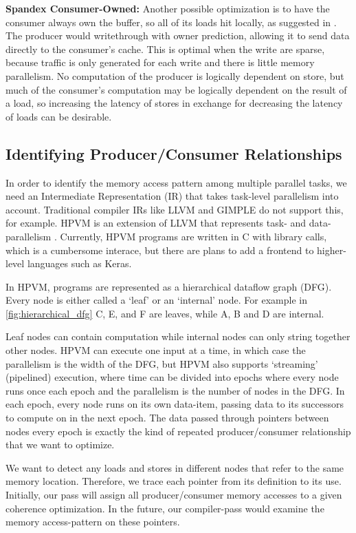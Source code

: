 \textbf{Spandex Consumer-Owned:} Another possible optimization is to have the consumer always own the buffer, so all of its loads hit locally, as suggested in \cite{dynamic_cache_coherence}. The producer would writethrough with owner prediction, allowing it to send data directly to the consumer's cache.
This is optimal when the write are sparse, because traffic is only generated for each write and there is little memory parallelism. No computation of the producer is logically dependent on store, but much of the consumer's computation may be logically dependent on the result of a load, so increasing the latency of stores in exchange for decreasing the latency of loads can be desirable.

\subsection{Identifying Producer/Consumer Relationships}

In order to identify the memory access pattern among multiple parallel tasks, we need an Intermediate Representation (IR) that takes task-level parallelism into account. Traditional compiler IRs like LLVM \cite{LLVM} and GIMPLE \cite{GIMPLE} do not support this, for example. HPVM is an extension of LLVM that represents task- and data-parallelism \cite{HPVM}. Currently, HPVM programs are written in C with library calls, which is a cumbersome interace, but there are plans to add a frontend to higher-level languages such as Keras.

In HPVM, programs are represented as a hierarchical dataflow graph (DFG). Every node is either called a `leaf' or an `internal' node. For example in \cref{fig:hierarchical_dfg} C, E, and F are leaves, while A, B and D are internal.

Leaf nodes can contain computation while internal nodes can only string together other nodes. HPVM can execute one input at a time, in which case the parallelism is the width of the DFG, but HPVM  also supports `streaming' (pipelined) execution, where time can be divided into epochs where every node runs once each epoch and the parallelism is the number of nodes in the DFG. In each epoch, every node runs on its own data-item, passing data to its successors to compute on in the next epoch. The data passed through pointers between nodes every epoch is exactly the kind of repeated producer/consumer relationship that we want to optimize.

We want to detect any loads and stores in different nodes that refer to the same memory location. Therefore, we trace each pointer from its definition to its use.
Initially, our pass will assign all producer/consumer memory accesses to a given coherence optimization.
In the future, our compiler-pass would examine the memory access-pattern on these pointers.

